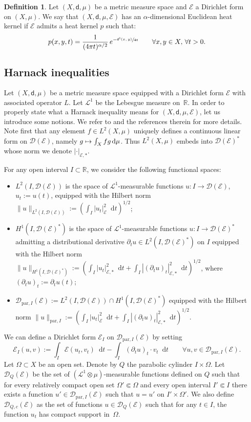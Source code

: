 \documentclass[JEP,XML,SOM,Unicode,published]{cedram}
\newcommand\mto{\mathchoice{\longmapsto}{\mapsto}{\mapsto}{\mapsto}}
\theoremstyle{plain}
\theoremstyle{definition}
\newtheorem{definition}[theorem]{Definition}
\newcommand{\setR}{\mathbb{R}}
\newcommand{\cE}{\mathcal{E}}
\newcommand{\cD}{\mathcal{D}}
\newcommand{\di}{\mathop{}\!\mathrm{d}}
\newcommand{\leb}{\mathscr{L}}
\newcommand{\dist}{\mathsf{d}}
\begin{document}
\begin{definition}\label{def:Euclideanheatkernel}
Let $(X,\dist,\mu)$ be a metric measure space and $\cE$ a Dirichlet form on $(X,\mu)$. We say that $(X,\dist,\mu,\cE)$ has an $\alpha$-dimensional Euclidean heat kernel if $\cE$ admits a heat kernel $p$ such that:
\[
p(x,y,t) = \frac{1}{(4 \pi t)^{\alpha/2}}\, e^{-\sfrac{\dist^2(x,y)}{4t}}\qquad \forall x,y \in X, \, \forall t>0.
\]
\end{definition}

\subsection*{Harnack inequalities}

Let $(X,\dist,\mu)$ be a metric measure space equipped with a Dirichlet form $\cE$ with associated operator $L$. Let $\leb^1$ be the Lebesgue measure on~$\setR$. In order to properly state what a Harnack inequality means for $(X,\dist,\mu,\cE)$, let us introduce some notions. We refer \eg to \cite{Sturm2} and the references therein for more details. Note first that any element $f \in L^2(X,\mu)$ uniquely defines a continuous linear form on $\cD(\cE)$, namely $g \mto \int_X fg \di \mu$. Thus $L^2(X,\mu)$ embeds into $\cD(\cE)^*$ whose norm we denote $|\cdot|_{\cE,*}$.

For any open interval $I \subset \setR$, we consider the following functional spaces:
\begin{itemize}
\item $L^2(I,\cD(\cE))$ is the space of $\leb^1$-measurable functions $u:I\to \cD(\cE)$, $u_t:=u(t)$, equipped with the Hilbert norm $\|u\|_{L^2(I,\cD(\cE))}:=(\int_I |u_t|_{\cE}^2 \di t)^{1/2}$;

\item $H^1(I,\cD(\cE)^*)$ is the space of $\leb^1$-measurable functions $u:I\to \cD(\cE)^*$ admitting a distributional derivative $\partial_t u \in L^2(I,\cD(\cE)^*)$ on $I$ equipped with the Hilbert norm $\|u\|_{H^1(I,\cD(\cE)^*)}:=(\int_I |u_t|_{\cE,*}^2 \di t + \int_I |(\partial_t u)_t |_{\cE,*}^2 \di t)^{1/2}$, where $(\partial_t u)_t:= \partial_t u(t)$;

\item $\cD_{\mathrm{par},I}(\cE):=L^2(I,\cD(\cE))\cap H^1(I,\cD(\cE)^*)$ equipped with the Hilbert norm $\|u\|_{\mathrm{par},I}:=(\int_I |u_t|_{\cE}^2 \di t + \int_I |(\partial_t u)_t |_{\cE,*}^2 \di t)^{1/2}$.
\end{itemize}
We can define a Dirichlet form $\cE_I$ on $\cD_{\mathrm{par},I}(\cE)$ by setting
\[
\cE_I(u,v):=\int_I\cE(u_t,v_t) \di t - \int_I (\partial_t u)_t \cdot v_t \di t \qquad \forall u, v \in \cD_{\mathrm{par},I}(\cE).
\]
Let $\Omega \subset X$ be an open set. Denote by $Q$ the parabolic cylinder $I \times \Omega$. Let $\cD_{Q}(\cE)$ be the set of $(\leb^1 \otimes \mu)$-measurable functions defined on $Q$ such that for every relatively compact open set $\Omega' \Subset \Omega$ and every open interval $I' \Subset I$ there exists a function $u' \in \cD_{\mathrm{par},I}(\cE)$ such that $u=u'$ on $I' \times \Omega'$. We also define $\cD_{Q,c}(\cE)$ as the set of functions $u \in \cD_{Q}(\cE)$ such that for any $t \in I$, the function $u_t$ has compact support in~$\Omega$.
\end{document}
